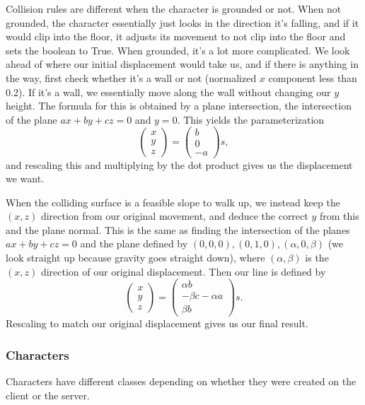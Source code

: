 \documentclass{article}
\begin{document}
Collision rules are different when the character is grounded or not.
When not grounded, the character essentially just looks in the direction it's
falling, and if it would clip into the floor, it adjusts its movement to not clip
into the floor and sets the  boolean to True.
When grounded, it's a lot more complicated. We look ahead of where our initial
displacement would take us, and if there is anything in the way, first check
whether it's a wall or not (normalized $x$ component less than 0.2). If it's a wall,
we essentially move along the wall without changing our $y$ height.
The formula for this is obtained by a plane intersection, the intersection of the
plane $ax + by + cz = 0$ and $y = 0$. This yields the parameterization
\[
\begin{pmatrix}
    x\\
    y\\
    z 
\end{pmatrix} =
\begin{pmatrix}
    b\\0\\-a
\end{pmatrix}s,\]
and rescaling this and multiplying by the dot product gives us the displacement
we want.

When the colliding surface is a feasible slope to walk up, we instead keep
the $(x, z)$ direction from our original movement, and deduce the correct
$y$ from this and the plane normal. This is the same as finding the
intersection of the planes $ax + by + cz = 0$ and the plane defined by
$(0, 0, 0), (0, 1, 0), (\alpha, 0, \beta)$ (we look straight up because gravity goes
straight down), where $(\alpha, \beta)$ is the $(x, z)$ direction of our
original displacement. Then our line is defined by
\[
\begin{pmatrix}
    x\\y\\z
\end{pmatrix} = 
\begin{pmatrix}
    \alpha b\\-\beta c - \alpha a\\\beta b
\end{pmatrix}s.\]
Rescaling to match our original displacement gives us our final result.
\subsubsection{Characters}
Characters have different classes depending on whether they were created on the client
or the server.
\end{document}
